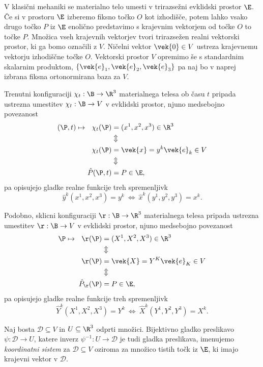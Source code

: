 V klasični mehaniki se materialno telo umesti v trirazsežni evklidski prostor $\E$. Če si
v prostoru $\E$ izberemo fiksno točko $O$ kot izhodišče, potem lahko vsako drugo točko $P$
iz $\E$ enolično predstavimo s krajevnim vektorjem od točke $O$ to točke $P$. Množica
vseh krajevnih vektorjev tvori trirazsežen realni vektorski prostor, ki ga bomo označili z $V$.
Ničelni vektor $\vek{0}\in V$ ustreza krajevnemu vektorju izhodiščne točke $O$.
Vektorski prostor $V$ opremimo še s standardnim skalarnim produktom,
$\{\vek{e}_1,\vek{e}_2,\vek{e}_3\}$ pa naj bo v naprej izbrana fiksna ortonormirana baza za $V$.

Trenutni konfiguraciji $\chi_t:\B\rightarrow\R^3$ materialnega telesa ob času $t$ pripada ustrezna
umestitev $\chi_t:\B\rightarrow V$ v evklidski prostor, njuno medsebojno povezanost
\begin{align*}
	(\P,t)\mapsto \ \ \chi_t(\P) &= (x^1,x^2,x^3)\in\R^3\\ &\Updownarrow \\
	\chi_t(\P) &= \vek{x} = y^k\vek{e}_k \in V \\ &\Updownarrow \\
	\hat{P}(\P ,t) &= P\in\E ,
\end{align*}
pa opisujejo gladke realne funkcije treh spremenljivk
\begin{equation*}
	\hat{y}^k(x^1,x^2,x^3) = y^k\ \Leftrightarrow\ \hat{x}^k(y^1,y^2,y^3) = x^k.
\end{equation*}

Podobno, sklicni konfiguraciji $\r:\B\rightarrow\R^3$ materialnega telesa pripada ustrezna
umestitev $\r:\B\rightarrow V$ v evklidski prostor, njuno medsebojno povezanost
\begin{align*}
	\P\mapsto \ \ \r(\P) &= (X^1,X^2,X^3)\in\R^3\\ &\Updownarrow \\
	\r(\P) &= \vek{X} = Y^K\vek{e}_K \in V \\ &\Updownarrow \\
	\hat{P}_{\r}(\P) &= P\in\E ,
\end{align*}
pa opisujejo gladke realne funkcije treh spremenljivk
\begin{equation*}
	\hat{Y}^k(X^1,X^2,X^3) = Y^k\ \Leftrightarrow\ \hat{X}^k(Y^1,Y^2,Y^3) = X^k.
\end{equation*}

\begin{definicija}\label{def-ks}
	Naj bosta $\mathcal{D}\subseteq V$ in $U\subseteq\R^3$ odprti množici. Bijektivno gladko preslikavo
	$\psi:\mathcal{D}\rightarrow U$, katere inverz $\psi^{-1}:U\rightarrow\mathcal{D}$
	je tudi gladka preslikava, imenujemo \emph{koordinatni sistem} za $\mathcal{D}\subseteq V$
	oziroma za množico tistih točk iz $\E$, ki imajo krajevni vektor v $\mathcal{D}$.
\end{definicija}

